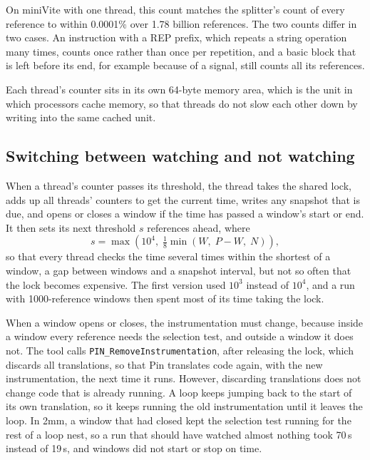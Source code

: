 \documentclass[11pt]{article}
\begin{document}
On miniVite with one thread, this count matches the splitter's count of every reference to within 0.0001\% over 1.78 billion references. The two counts differ in two cases. An instruction with a REP prefix, which repeats a string operation many times, counts once rather than once per repetition, and a basic block that is left before its end, for example because of a signal, still counts all its references.

Each thread's counter sits in its own 64-byte memory area, which is the unit in which processors cache memory, so that threads do not slow each other down by writing into the same cached unit.

\subsection{Switching between watching and not watching}
\label{sec:switching}

When a thread's counter passes its threshold, the thread takes the shared lock, adds up all threads' counters to get the current time, writes any snapshot that is due, and opens or closes a window if the time has passed a window's start or end. It then sets its next threshold $s$ references ahead, where
\begin{equation}
s = \max\!\left(10^4,\; \tfrac{1}{8}\min(W,\; P - W,\; N)\right),
\end{equation}
so that every thread checks the time several times within the shortest of a window, a gap between windows and a snapshot interval, but not so often that the lock becomes expensive. The first version used $10^3$ instead of $10^4$, and a run with 1000-reference windows then spent most of its time taking the lock.

When a window opens or closes, the instrumentation must change, because inside a window every reference needs the selection test, and outside a window it does not. The tool calls \texttt{PIN\_RemoveInstrumentation}, after releasing the lock, which discards all translations, so that Pin translates code again, with the new instrumentation, the next time it runs. However, discarding translations does not change code that is already running. A loop keeps jumping back to the start of its own translation, so it keeps running the old instrumentation until it leaves the loop. In 2mm, a window that had closed kept the selection test running for the rest of a loop nest, so a run that should have watched almost nothing took 70\,s instead of 19\,s, and windows did not start or stop on time.
\end{document}
